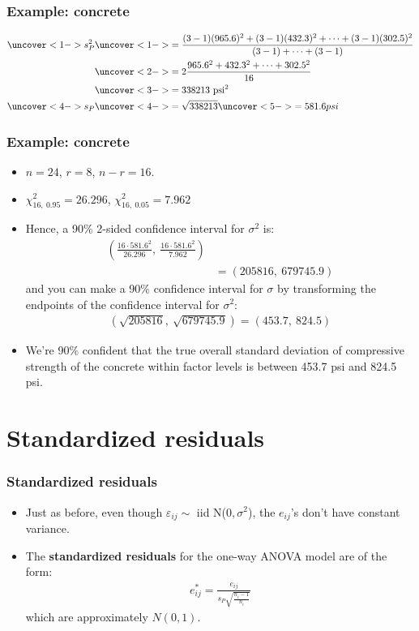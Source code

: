 \documentclass[handout]{beamer}\usepackage[]{graphicx}\usepackage[]{color}
\providecommand{\e}{\varepsilon}
\numberwithin{equation}{section}
\begin{document}
\begin{frame}
\frametitle{Example: concrete} \small
\begin{align*}
\uncover<1->{s_P^2} & \uncover<1->{= \frac{(3-1)(965.6)^2 + (3-1)(432.3)^2 + \cdots + (3-1)(302.5)^2}{(3 -1 ) + \cdots + (3-1)}} \\
&\uncover<2->{=2 \frac{965.6^2 + 432.3^2 + \cdots + 302.5^2}{16}} \\
&\uncover<3->{= 338213 \text{ psi}^2} \\
\uncover<4->{s_P} &\uncover<4->{= \sqrt{338213}} \uncover<5->{= 581.6 psi}
\end{align*}

\end{frame}

\begin{frame}
\frametitle{Example: concrete}
\begin{itemize}
\item $n = 24$, $r = 8$, $n-r = 16$.
\pause \item $\chi^2_{16, \ 0.95} = 26.296$, $\chi^2_{16, \ 0.05} = 7.962$
\pause \item Hence, a 90\% 2-sided confidence interval for $\sigma^2$ is:
\pause \begin{align*}
\left ( \frac{16 \cdot 581.6^2}{26.296}, \ \frac{16 \cdot 581.6^2}{7.962} \right ) \\
&= (205816, \ 679745.9)
\end{align*}
\pause and you can make a 90\% confidence interval for $\sigma$ by transforming the endpoints of the confidence interval for $\sigma^2$:
\pause \begin{align*}
 (\sqrt{205816}, \ \sqrt{679745.9}) = (453.7, \ 824.5)
\end{align*}
\pause \item We're 90\% confident that the true overall standard deviation of compressive strength of the concrete within factor levels is between 453.7 psi and 824.5 psi.
\end{itemize}
\end{frame}


\section{Standardized residuals}
\begin{frame}
\frametitle{Standardized residuals}
\begin{itemize}
\item Just as before, even though $\e_{ij} \sim $ iid N($0, \sigma^2$), the $e_{ij}$'s don't have constant variance.
\pause \item The {\bf standardized residuals} for the one-way ANOVA model are of the form:
\pause \begin{align*}
e_{ij}^* = \frac{e_{ij}}{s_P \sqrt{\frac{n_i - 1}{n_i}}}
\end{align*}
which are approximately $N(0,1)$.
\end{itemize}
\end{frame}
\end{document}
